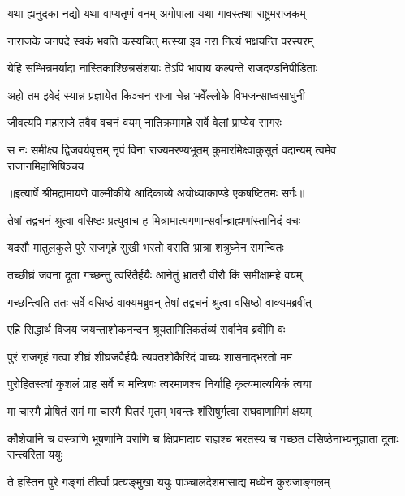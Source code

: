 \twolineshloka
{यथा ह्यनुदका नद्यो यथा वाप्यतृणं वनम्}
{अगोपाला यथा गावस्तथा राष्ट्रमराजकम्} %

\twolineshloka
{नाराजके जनपदे स्वकं भवति कस्यचित्}
{मत्स्या इव नरा नित्यं भक्षयन्ति परस्परम्} %

\twolineshloka
{येहि सम्भिन्नमर्यादा नास्तिकाश्छिन्नसंशयाः}
{तेऽपि भावाय कल्पन्ते राजदण्डनिपीडिताः} %

\twolineshloka
{अहो तम इवेदं स्यान्न प्रज्ञायेत किञ्चन}
{राजा चेन्न भवेँल्लोके विभजन्साध्वसाधुनी} %

\twolineshloka
{जीवत्यपि महाराजे तवैव वचनं वयम्}
{नातिक्रमामहे सर्वे वेलां प्राप्येव सागरः} %

\fourlineindentedshloka
{स नः समीक्ष्य द्विजवर्यवृत्तम्}
{नृपं विना राज्यमरण्यभूतम्}
{कुमारमिक्ष्वाकुसुतं वदान्यम्}
{त्वमेव राजानमिहाभिषिञ्चय} %


{॥इत्यार्षे श्रीमद्रामायणे वाल्मीकीये आदिकाव्ये अयोध्याकाण्डे एकषष्टितमः सर्गः॥}


\twolineshloka
{तेषां तद्वचनं श्रुत्वा वसिष्ठः प्रत्युवाच ह}
{मित्रामात्यगणान्सर्वान्ब्राह्मणांस्तानिदं वचः} %

\twolineshloka
{यदसौ मातुलकुले पुरे राजगृहे सुखी}
{भरतो वसति भ्रात्रा शत्रुघ्नेन समन्वितः} %

\twolineshloka
{तच्छीघ्रं जवना दूता गच्छन्तु त्वरितैर्हयैः}
{आनेतुं भ्रातरौ वीरौ किं समीक्षामहे वयम्} %

\twolineshloka
{गच्छन्त्विति ततः सर्वे वसिष्ठं वाक्यमब्रुवन्}
{तेषां तद्वचनं श्रुत्वा वसिष्ठो वाक्यमब्रवीत्} %

\twolineshloka
{एहि सिद्धार्थ विजय जयन्ताशोकनन्दन}
{श्रूयतामितिकर्तव्यं सर्वानेव ब्रवीमि वः} %

\twolineshloka
{पुरं राजगृहं गत्वा शीघ्रं शीघ्रजवैर्हयैः}
{त्यक्तशोकैरिदं वाच्यः शासनाद्भरतो मम} %

\twolineshloka
{पुरोहितस्त्वां कुशलं प्राह सर्वे च मन्त्रिणः}
{त्वरमाणश्च निर्याहि कृत्यमात्ययिकं त्वया} %

\twolineshloka
{मा चास्मै प्रोषितं रामं मा चास्मै पितरं मृतम्}
{भवन्तः शंसिषुर्गत्वा राघवाणामिमं क्षयम्} %

\threelineshloka
{कौशेयानि च वस्त्राणि भूषणानि वराणि च}
{क्षिप्रमादाय राज्ञश्च भरतस्य च गच्छत}
{वसिष्ठेनाभ्यनुज्ञाता दूताः सन्त्वरिता ययुः} %

\twolineshloka
{ते हस्तिन पुरे गङ्गां तीर्त्वा प्रत्यङ्मुखा ययुः}
{पाञ्चालदेशमासाद्य मध्येन कुरुजाङ्गलम्} %


